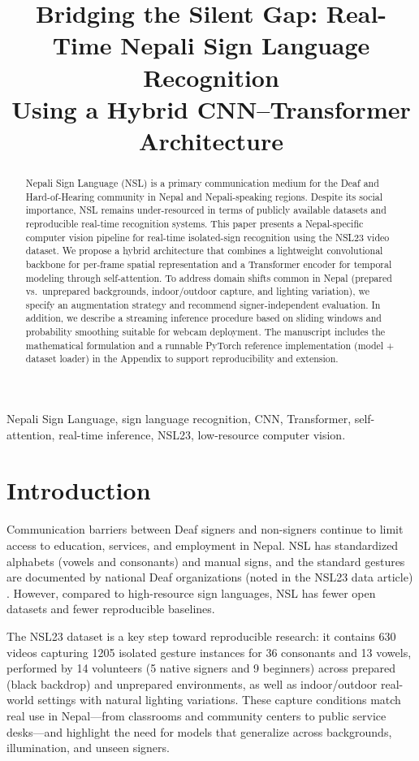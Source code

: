 \documentclass[conference]{IEEEtran}
\title{Bridging the Silent Gap: Real-Time Nepali Sign Language Recognition\\Using a Hybrid CNN--Transformer Architecture}
\author{
\IEEEauthorblockN{Shaswat Chapagain\IEEEauthorrefmark{1}}
\IEEEauthorblockA{\IEEEauthorrefmark{1}Department/College, City, Nepal \\
Email: swatlegacy@gmail.com}
}
\begin{document}
\maketitle

\begin{abstract}
Nepali Sign Language (NSL) is a primary communication medium for the Deaf and Hard-of-Hearing community in Nepal and Nepali-speaking regions. Despite its social importance, NSL remains under-resourced in terms of publicly available datasets and reproducible real-time recognition systems. This paper presents a Nepal-specific computer vision pipeline for real-time isolated-sign recognition using the NSL23 video dataset. We propose a hybrid architecture that combines a lightweight convolutional backbone for per-frame spatial representation and a Transformer encoder for temporal modeling through self-attention. To address domain shifts common in Nepal (prepared vs.\ unprepared backgrounds, indoor/outdoor capture, and lighting variation), we specify an augmentation strategy and recommend signer-independent evaluation. In addition, we describe a streaming inference procedure based on sliding windows and probability smoothing suitable for webcam deployment. The manuscript includes the mathematical formulation and a runnable PyTorch reference implementation (model + dataset loader) in the Appendix to support reproducibility and extension.
\end{abstract}

\begin{IEEEkeywords}
Nepali Sign Language, sign language recognition, CNN, Transformer, self-attention, real-time inference, NSL23, low-resource computer vision.
\end{IEEEkeywords}

\section{Introduction}
Communication barriers between Deaf signers and non-signers continue to limit access to education, services, and employment in Nepal. NSL has standardized alphabets (vowels and consonants) and manual signs, and the standard gestures are documented by national Deaf organizations (noted in the NSL23 data article) \cite{sunuwar2024dib}. However, compared to high-resource sign languages, NSL has fewer open datasets and fewer reproducible baselines.

The NSL23 dataset \cite{sunuwar2024dib,zenodo_nsl23} is a key step toward reproducible research: it contains 630 videos capturing 1205 isolated gesture instances for 36 consonants and 13 vowels, performed by 14 volunteers (5 native signers and 9 beginners) across prepared (black backdrop) and unprepared environments, as well as indoor/outdoor real-world settings with natural lighting variations. These capture conditions match real use in Nepal---from classrooms and community centers to public service desks---and highlight the need for models that generalize across backgrounds, illumination, and unseen signers.
\end{document}
